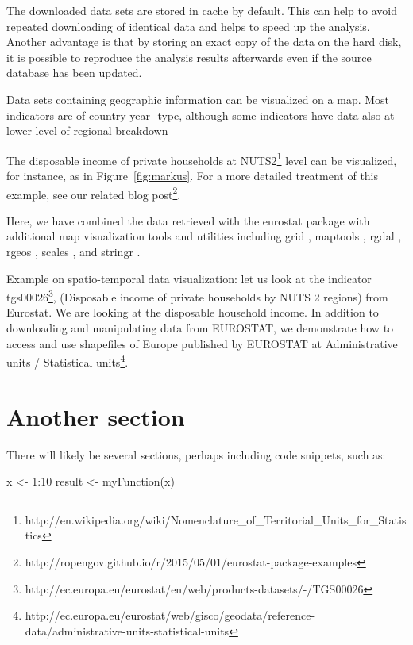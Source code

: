 The downloaded data sets are stored in cache by default. This can help
to avoid repeated downloading of identical data and helps to speed up
the analysis. Another advantage is that by storing an exact copy of
the data on the hard disk, it is possible to reproduce the analysis
results afterwards even if the source database has been updated.

Data sets containing geographic information can be visualized on a
map. Most indicators are of country-year -type, although some
indicators have data also at lower level of regional breakdown

The disposable income of private households at
NUTS2\footnote{http://en.wikipedia.org/wiki/Nomenclature\_of\_Territorial\_Units\_for\_Statistics}
level can be visualized, for instance, as in
Figure~\ref{fig:markus}. For a more detailed treatment of this
example, see our related blog
post\footnote{http://ropengov.github.io/r/2015/05/01/eurostat-package-examples}.


Here, we have combined the data retrieved with the eurostat package
with additional map visualization tools and utilities including
grid \citep{grid}, maptools \citep{maptools}, rgdal \citep{rgdal},
rgeos \citep{rgeos}, scales \citep{scales}, and
stringr \citep{stringr}.

Example on spatio-temporal data visualization: let us look at the indicator tgs00026\footnote{http://ec.europa.eu/eurostat/en/web/products-datasets/-/TGS00026}, (Disposable income of private households by NUTS 2 regions) from Eurostat. We are looking at the disposable household income. In addition to downloading and manipulating data from EUROSTAT, we demonstrate how to access and use shapefiles of Europe published by EUROSTAT at Administrative units / Statistical units\footnote{http://ec.europa.eu/eurostat/web/gisco/geodata/reference-data/administrative-units-statistical-units}.



\section{Another section}

There will likely be several sections, perhaps including code snippets, such as:

\begin{example}
  x <- 1:10
  result <- myFunction(x)
\end{example}



